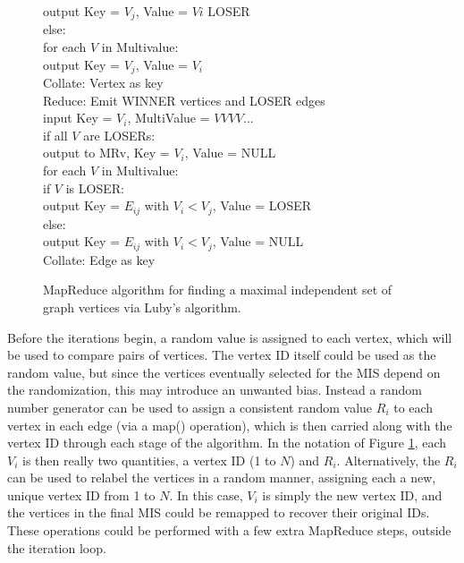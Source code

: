 \begin{figure}[htb]
\begin{center}
{\begin{minipage}{\textwidth}
\begin{tabbing}
     \> \> \> \> \> output Key = $V_j$, Value = $Vi$ LOSER \\
       \> \> \> else: \\
      \> \> \> \> for each $V$ in Multivalue: \\
     \> \> \> \> \> output Key = $V_j$, Value = $V_i$ \\
 Collate: \> Vertex as key \\
 Reduce: \> Emit WINNER vertices and LOSER edges \\
       \> \> \> input Key = $V_i$, MultiValue = $V V V V ...$ \\
       \> \> \> if all $V$ are LOSERs: \\
      \> \> \> \> output to MRv, Key = $V_i$, Value = NULL \\
       \> \> \> for each $V$ in Multivalue: \\
      \> \> \> \> if $V$ is LOSER: \\
     \> \> \> \> \> output Key = $E_{ij}$ with $V_i < V_j$, Value = LOSER \\
      \> \> \> \> else: \\
     \> \> \> \> \> output Key = $E_{ij}$ with $V_i < V_j$, Value = NULL \\
 Collate: \> Edge as key \\

  \end{tabbing}
 \end{minipage}}\end{center}

 \caption{MapReduce algorithm for finding a maximal independent set of
 graph vertices via Luby's algorithm.}

 \label{fig:luby}
\end{figure}

Before the iterations begin, a random value is assigned to each
vertex, which will be used to compare pairs of vertices.  The vertex
ID itself could be used as the random value, but since the vertices
eventually selected for the MIS depend on the randomization, this may
introduce an unwanted bias.  Instead a random number generator can be
used to assign a consistent random value $R_i$ to each vertex in each
edge (via a map() operation), which is then carried along with the
vertex ID through each stage of the algorithm.  In the notation of
Figure \ref{fig:luby}, each $V_i$ is then really two quantities, a
vertex ID (1 to $N$) and $R_i$.  Alternatively, the $R_i$ can be used
to relabel the vertices in a random manner, assigning each a new,
unique vertex ID from 1 to $N$.  In this case, $V_i$ is simply the new
vertex ID, and the vertices in the final MIS could be remapped to
recover their original IDs.  These operations could be performed with
a few extra MapReduce steps, outside the iteration loop.

